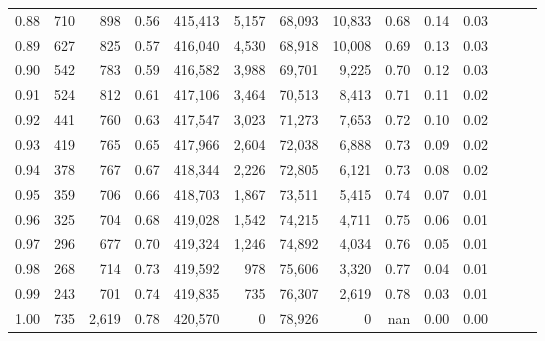 \begin{tabular}{rrrrrrrrrrrrrr}
0.88 &     710 &    898 &  0.56 &  415,413 &    5,157 &  68,093 &  10,833 &  0.68 &  0.14 &      0.03 \\
0.89 &     627 &    825 &  0.57 &  416,040 &    4,530 &  68,918 &  10,008 &  0.69 &  0.13 &      0.03 \\
0.90 &     542 &    783 &  0.59 &  416,582 &    3,988 &  69,701 &   9,225 &  0.70 &  0.12 &      0.03 \\
0.91 &     524 &    812 &  0.61 &  417,106 &    3,464 &  70,513 &   8,413 &  0.71 &  0.11 &      0.02 \\
0.92 &     441 &    760 &  0.63 &  417,547 &    3,023 &  71,273 &   7,653 &  0.72 &  0.10 &      0.02 \\
0.93 &     419 &    765 &  0.65 &  417,966 &    2,604 &  72,038 &   6,888 &  0.73 &  0.09 &      0.02 \\
0.94 &     378 &    767 &  0.67 &  418,344 &    2,226 &  72,805 &   6,121 &  0.73 &  0.08 &      0.02 \\
0.95 &     359 &    706 &  0.66 &  418,703 &    1,867 &  73,511 &   5,415 &  0.74 &  0.07 &      0.01 \\
0.96 &     325 &    704 &  0.68 &  419,028 &    1,542 &  74,215 &   4,711 &  0.75 &  0.06 &      0.01 \\
0.97 &     296 &    677 &  0.70 &  419,324 &    1,246 &  74,892 &   4,034 &  0.76 &  0.05 &      0.01 \\
0.98 &     268 &    714 &  0.73 &  419,592 &      978 &  75,606 &   3,320 &  0.77 &  0.04 &      0.01 \\
0.99 &     243 &    701 &  0.74 &  419,835 &      735 &  76,307 &   2,619 &  0.78 &  0.03 &      0.01 \\
1.00 &     735 &  2,619 &  0.78 &  420,570 &        0 &  78,926 &       0 &   nan &  0.00 &      0.00 \\
\bottomrule
\end{tabular}
